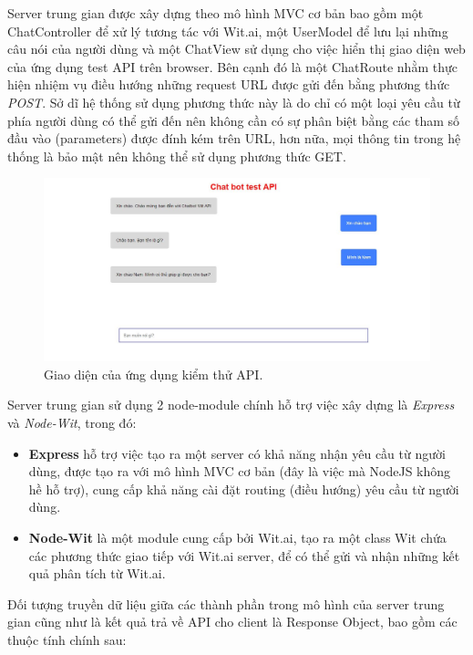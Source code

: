 \documentclass[12pt]{report}
\begin{document}
Server trung gian được xây dựng theo mô hình MVC cơ bản bao gồm một ChatController để xử lý tương tác với Wit.ai, một UserModel để lưu lại những câu nói của người dùng và một ChatView sử dụng cho việc hiển thị giao diện web của ứng dụng test API trên browser. Bên cạnh đó là một ChatRoute nhằm thực hiện nhiệm vụ điều hướng những request URL được gửi đến bằng phương thức \textit{POST}. Sở dĩ hệ thống sử dụng phương thức này là do chỉ có một loại yêu cầu từ phía người dùng có thể gửi đến nên không cần có sự phân biệt bằng các tham số đầu vào (parameters) được đính kém trên URL, hơn nữa, mọi thông tin trong hệ thống là bảo mật nên không thể sử dụng phương thức GET.

\begin{figure}[H]
	\centering
    \includegraphics[width=15cm]{Pics/Chap6/test-api.JPG}
  	\caption{Giao diện của ứng dụng kiểm thử API.}
\end{figure}

Server trung gian sử dụng 2 node-module chính hỗ trợ việc xây dựng là \textit{Express} và \textit{Node-Wit}, trong đó:

\begin{itemize}
	\item \textbf{Express} hỗ trợ việc tạo ra một server có khả năng nhận yêu cầu từ người dùng, được tạo ra với mô hình MVC cơ bản (đây là việc mà NodeJS không hề hỗ trợ), cung cấp khả năng cài đặt routing (điều hướng) yêu cầu từ người dùng.
	\item \textbf{Node-Wit} là một module cung cấp bởi Wit.ai, tạo ra một class Wit chứa các phương thức giao tiếp với Wit.ai server, để có thể gửi và nhận những kết quả phân tích từ Wit.ai.
\end{itemize}

Đối tượng truyền dữ liệu giữa các thành phần trong mô hình của server trung gian cũng như là kết quả trả về API cho client là Response Object, bao gồm các thuộc tính chính sau:
\end{document}
